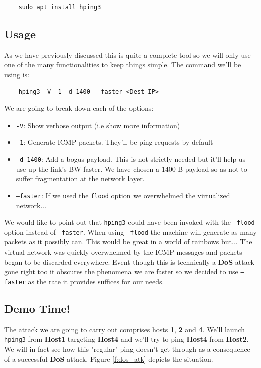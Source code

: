 \documentclass[12pt]{article}
\begin{document}
		\begin{verbatim}
	sudo apt install hping3
		\end{verbatim}

	\subsection{Usage}
		As we have previously discussed this is quite a complete tool so we will only use one of the many functionalities to keep things simple. The command we'll be using is:

		\begin{verbatim}
	hping3 -V -1 -d 1400 --faster <Dest_IP>
		\end{verbatim}

		We are going to break down each of the options:

		\begin{itemize}
			\item \texttt{-V}: Show verbose output (i.e show more information)
			\item \texttt{-1}: Generate ICMP packets. They'll be ping requests by default
			\item \texttt{-d 1400}: Add a bogus payload. This is not strictly needed but it'll help us use up the link's BW faster. We have chosen a 1400 B payload so as not to suffer fragmentation at the network layer.
			\item \texttt{--faster}: If we used the \texttt{flood} option we overwhelmed the virtualized network...
		\end{itemize}

		We would like to point out that \texttt{hping3} could have been invoked with the \texttt{--flood} option instead of \texttt{--faster}. When using \texttt{--flood} the machine will generate as many packets as it possibly can. This would be great in a world of rainbows but... The virtual network was quickly overwhelmed by the ICMP messages and packets began to be discarded everywhere. Event though this is technically a \textbf{DoS} attack gone right too it obscures the phenomena we are faster so we decided to use \texttt{--faster} as the rate it provides suffices for our needs.

	\subsection{Demo Time!}
		The attack we are going to carry out comprises hosts \textbf{1}, \textbf{2} and \textbf{4}. We'll launch \texttt{hping3} from \textbf{Host1} targeting \textbf{Host4} and we'll try to ping \textbf{Host4} from \textbf{Host2}. We will in fact see how this "regular" ping doesn't get through as a consequence of a successful \textbf{DoS} attack. Figure \ref{f:dos_atk} depicts the situation.
\end{document}
